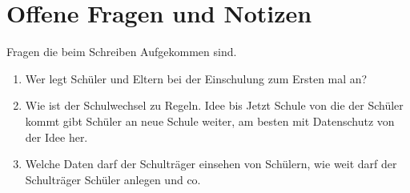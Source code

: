 \section{Offene Fragen und Notizen}
Fragen die beim Schreiben Aufgekommen sind.
\begin{enumerate}
	\item Wer legt Schüler und Eltern bei der Einschulung zum Ersten mal an?
	\item Wie ist der Schulwechsel zu Regeln. Idee bis Jetzt Schule von die der Schüler kommt gibt Schüler an neue Schule weiter, am besten mit Datenschutz von der Idee her.
	\item Welche Daten darf der Schulträger einsehen von Schülern, wie weit darf der Schulträger Schüler anlegen und co.
\end{enumerate}